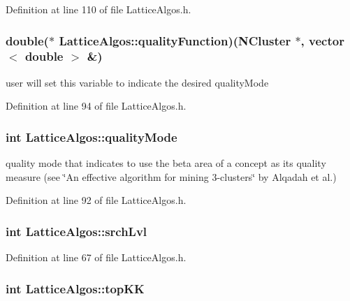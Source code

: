 Definition at line 110 of file LatticeAlgos.h.

\hypertarget{class_lattice_algos_ae25f31284b5956278f390d0edc412ef8}{
\subsubsection[{qualityFunction}]{\setlength{\rightskip}{0pt plus 5cm}double($\ast$ {\bf LatticeAlgos::qualityFunction})({\bf NCluster} $\ast$, vector$<$ double $>$ \&)}}
\label{class_lattice_algos_ae25f31284b5956278f390d0edc412ef8}


user will set this variable to indicate the desired qualityMode 



Definition at line 94 of file LatticeAlgos.h.

\hypertarget{class_lattice_algos_aabdafd3fa45b3ed1d773b313e3a60e17}{
\subsubsection[{qualityMode}]{\setlength{\rightskip}{0pt plus 5cm}int {\bf LatticeAlgos::qualityMode}}}
\label{class_lattice_algos_aabdafd3fa45b3ed1d773b313e3a60e17}


quality mode that indicates to use the beta area of a concept as its quality measure (see \char`\"{}An effective algorithm for mining 3-\/clusters\char`\"{} by Alqadah et al.) 



Definition at line 92 of file LatticeAlgos.h.

\hypertarget{class_lattice_algos_a7061dd2e2590fa24e0dfb16f28509dce}{
\subsubsection[{srchLvl}]{\setlength{\rightskip}{0pt plus 5cm}int {\bf LatticeAlgos::srchLvl}}}
\label{class_lattice_algos_a7061dd2e2590fa24e0dfb16f28509dce}


Definition at line 67 of file LatticeAlgos.h.

\hypertarget{class_lattice_algos_a90e06533d513efc4635905624283eeae}{
\subsubsection[{topKK}]{\setlength{\rightskip}{0pt plus 5cm}int {\bf LatticeAlgos::topKK}}}
\label{class_lattice_algos_a90e06533d513efc4635905624283eeae}


